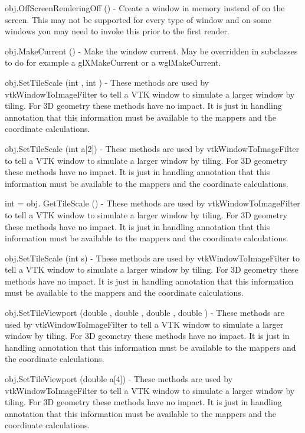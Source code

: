 \begin{DoxyItemize}
\item {\ttfamily obj.\-Off\-Screen\-Rendering\-Off ()} -\/ Create a window in memory instead of on the screen. This may not be supported for every type of window and on some windows you may need to invoke this prior to the first render.  
\item {\ttfamily obj.\-Make\-Current ()} -\/ Make the window current. May be overridden in subclasses to do for example a gl\-X\-Make\-Current or a wgl\-Make\-Current.  
\item {\ttfamily obj.\-Set\-Tile\-Scale (int , int )} -\/ These methods are used by vtk\-Window\-To\-Image\-Filter to tell a V\-T\-K window to simulate a larger window by tiling. For 3\-D geometry these methods have no impact. It is just in handling annotation that this information must be available to the mappers and the coordinate calculations.  
\item {\ttfamily obj.\-Set\-Tile\-Scale (int a\mbox{[}2\mbox{]})} -\/ These methods are used by vtk\-Window\-To\-Image\-Filter to tell a V\-T\-K window to simulate a larger window by tiling. For 3\-D geometry these methods have no impact. It is just in handling annotation that this information must be available to the mappers and the coordinate calculations.  
\item {\ttfamily int = obj. Get\-Tile\-Scale ()} -\/ These methods are used by vtk\-Window\-To\-Image\-Filter to tell a V\-T\-K window to simulate a larger window by tiling. For 3\-D geometry these methods have no impact. It is just in handling annotation that this information must be available to the mappers and the coordinate calculations.  
\item {\ttfamily obj.\-Set\-Tile\-Scale (int s)} -\/ These methods are used by vtk\-Window\-To\-Image\-Filter to tell a V\-T\-K window to simulate a larger window by tiling. For 3\-D geometry these methods have no impact. It is just in handling annotation that this information must be available to the mappers and the coordinate calculations.  
\item {\ttfamily obj.\-Set\-Tile\-Viewport (double , double , double , double )} -\/ These methods are used by vtk\-Window\-To\-Image\-Filter to tell a V\-T\-K window to simulate a larger window by tiling. For 3\-D geometry these methods have no impact. It is just in handling annotation that this information must be available to the mappers and the coordinate calculations.  
\item {\ttfamily obj.\-Set\-Tile\-Viewport (double a\mbox{[}4\mbox{]})} -\/ These methods are used by vtk\-Window\-To\-Image\-Filter to tell a V\-T\-K window to simulate a larger window by tiling. For 3\-D geometry these methods have no impact. It is just in handling annotation that this information must be available to the mappers and the coordinate calculations.  

\end{DoxyItemize}
